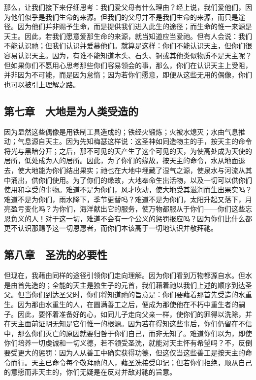 那么，让我们接下来仔细思考：我们爱父母有什么理由？经上说，我们爱他们，因为他们似乎是我们生命的来源。但我们的父母并不是我们生命的来源，而只是途径。因为他们并非赐予生命，而是提供我们进入此生的途径；而生命的惟一来源是天主。因此，若我们愿意爱那生命的来源，就当知道应当爱祂。但有人会说：我们不能认识祂；但我们认识并爱慕他们。就算是这样：你们不能认识天主，但你们很容易认识天主。因为，有谁不能知道木头、石头、铜或其他类似物质不是天主呢？但如果你们不愿用心思考那些你们容易领会的事，那么，你们在认识天主上受阻，并非因为不可能，而是因为怠惰；因为若你们愿意，即便从这些无用的偶像，你们也可以被引上理解之路。\par


\subsection{第七章　大地是为人类受造的}

因为显然这些偶像是用铁制工具造成的；铁经火锻炼；火被水熄灭；水由气息推动；气息源自天主。因为先知梅瑟这样说：这圣神如同造物主的手，按天主的命令将光与黑暗分开；之后，那不可见的天产生了这个可见的天，为使高处成为天使的居所，低处成为人的居所。因此，为了你们的缘故，按天主的命令，水从地面退去，使大地能为你们结出果实；祂也在大地中埋藏了湿气之源，使泉水与河流从其中涌出，供你们使用。为了你们的缘故，大地奉命生出活物，以及一切可以供你们使用和享受的事物。难道不是为你们，风才吹动，使大地受其滋润而生出果实吗？难道不是为你们，雨水降下，季节更替吗？难道不是为你们，太阳升起又落下，月亮盈亏变化吗？为你们，海洋献出它的服务，使万物都服从于你们——你们这些忘恩负义的人！对于这一切，难道不会有一个公义的惩罚报应吗？因为你们比什么都更不认识那赐予这一切恩惠者，而你们本该高于一切地认识并敬拜祂。\par


\subsection{第八章　圣洗的必要性}

但现在，我藉由同样的途径引领你们走向理解。因为你们看到万物都源自水。但水是由首先造的；全能的天主是独生子的元首，我们藉着祂以我们上述的顺序到达圣父。但当你们到达圣父时，你们将知道祂的旨意是：你们要藉着那首先受造的水重生。因为那由水重生的人，在圆满善工之后，便成为那使他在不朽中重生者的嗣子。因此，要怀着准备好的心，如同儿子走向父亲一样，使你们的罪得以洗除，并在天主面前证明无知是它们惟一的根源。因为若在得知这些事后，你们仍留在不信中，那么你们灭亡的原因就要归咎于你们自己，而非无知了。难道你们以为，即使你们培养一切虔诚和一切义德，若不领受圣洗，就能对天主怀有希望吗？不，反倒要受更大的惩罚：因为人从善工中确实获得功德，但这仅当这些善工是按天主的命令而行。天主已命令每个敬拜祂的人，藉圣洗接受印记；但若你们拒绝，顺从自己的意愿而非天主的，你们无疑是在反对并敌对祂的旨意。\par

